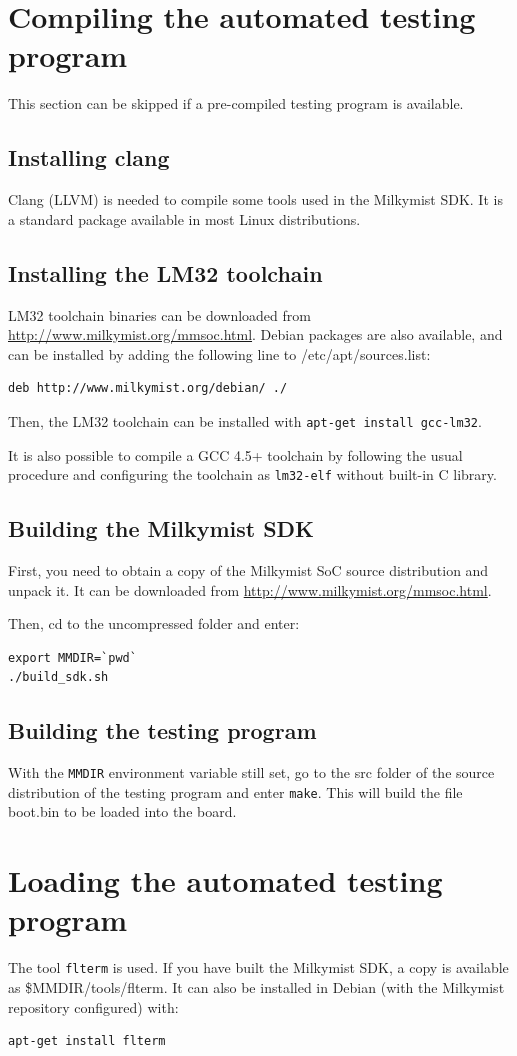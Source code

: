\documentclass[a4paper,11pt]{article}
\begin{document}
\section{Compiling the automated testing program}
This section can be skipped if a pre-compiled testing program is available.
\subsection{Installing clang}
Clang (LLVM) is needed to compile some tools used in the Milkymist SDK. It is a standard package available in most Linux distributions.
\subsection{Installing the LM32 toolchain}
LM32 toolchain binaries can be downloaded from \url{http://www.milkymist.org/mmsoc.html}. Debian packages are also available, and can be installed by adding the following line to /etc/apt/sources.list:
\begin{verbatim}
deb http://www.milkymist.org/debian/ ./
\end{verbatim}
Then, the LM32 toolchain can be installed with \verb!apt-get install gcc-lm32!.

It is also possible to compile a GCC 4.5+ toolchain by following the usual procedure and configuring the toolchain as \verb!lm32-elf! without built-in C library.

\subsection{Building the Milkymist SDK}
First, you need to obtain a copy of the Milkymist SoC source distribution and unpack it. It can be downloaded from \url{http://www.milkymist.org/mmsoc.html}.

Then, cd to the uncompressed folder and enter:
\begin{verbatim}
export MMDIR=`pwd`
./build_sdk.sh
\end{verbatim}

\subsection{Building the testing program}
With the \verb!MMDIR! environment variable still set, go to the src folder of the source distribution of the testing program and enter \verb!make!. This will build the file boot.bin to be loaded into the board.

\section{Loading the automated testing program}
The tool \verb!flterm! is used. If you have built the Milkymist SDK, a copy is available as \$MMDIR/tools/flterm. It can also be installed in Debian (with the Milkymist repository configured) with:
\begin{verbatim}
apt-get install flterm
\end{verbatim}
\end{document}
